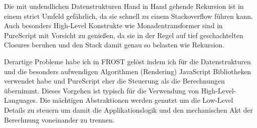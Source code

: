 Die mit undendlichen Datenstrukturen Hand in Hand gehende Rekursion ist in einem
strict Umfeld gefährlich, da sie schnell zu einem Stackoverflow führen kann.
Auch besonders High-Level Konstrukte wie Monadentransformer sind in PureScript
mit Vorsicht zu genießen, da sie in der Regel auf tief geschachtelten Closures
beruhen und den Stack damit genau so belasten wie Rekursion.

Derartige Probleme habe ich in FROST gelöst indem ich für die Datenstrukturen
und die besonders aufwendigen Algorithmen (Rendering) JavaScript Bibliotheken
verwendet habe und PureScript eher die Steuerung als die Berechnungen übernimmt.
Dieses Vorgehen ist typisch für die Verwendung von High-Level-Languages. Die
mächtigen Abstraktionen werden genutzt um die Low-Level Details zu steuern um
damit die Applikationslogik und den mechanischen Akt der Berechnung voneinander
zu trennen.

